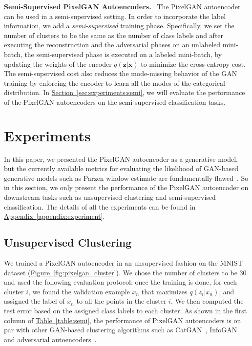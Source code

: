 \documentclass{article}
\newcommand{\mysec}[1]{\hyperref[sec:#1]{Section~\ref*{sec:#1}}}
\newcommand{\mytable}[1]{\hyperref[table:#1]{Table~\ref*{table:#1}}}
\newcommand{\myfig}[1]{\hyperref[fig:#1]{Figure~\ref*{fig:#1}}}
\newcommand{\myappendix}[1]{\hyperref[appendix:#1]{Appendix~\ref*{appendix:#1}}}
\DeclareRobustCommand{\parhead}[1]{\textbf{#1}~}
\begin{document}
\parhead{Semi-Supervised PixelGAN Autoencoders.} The PixelGAN autoencoder can be used in a semi-supervised setting. In order to incorporate the label information, we add a \emph{semi-supervised} training phase. Specifically, we set the number of clusters to be the same as the number of class labels and after executing the reconstruction and the adversarial phases on an unlabeled mini-batch, the semi-supervised phase is executed on a labeled mini-batch, by updating the weights of the encoder $q(\mathbf{z}|\mathbf{x})$ to minimize the cross-entropy cost. The semi-supervised cost also reduces the mode-missing behavior of the GAN training by enforcing the encoder to learn all the modes of the categorical distribution. In \mysec{experiments:semi}, we will evaluate the performance of the PixelGAN autoencoders on the semi-supervised classification tasks.


\section{Experiments}\label{sec:experiments}



In this paper, we presented the PixelGAN autoencoder as a generative model, but the currently available metrics for evaluating the likelihood of GAN-based generative models such as Parzen window estimate are fundamentally flawed~\citep{theis}. So in this section, we only present the performance of the PixelGAN autoencoder on downstream tasks such as unsupervised clustering and semi-supervised classification. The details of all the experiments can be found in \myappendix{experiment}.

\subsection{Unsupervised Clustering}\label{sec:experiments:unsup}
We trained a PixelGAN autoencoder in an unsupervised fashion on the MNIST dataset (\myfig{pixelgan_cluster}). We chose the number of clusters to be 30 and used the following evaluation protocol: once the training is done, for each cluster $i$, we found the validation example $x_n$ that maximizes $q(z_i|x_n)$, and assigned the label of $x_n$ to all the points in the cluster $i$. We then computed the test error based on the assigned class labels to each cluster. As shown in the first column of \mytable{semi}, the performance of PixelGAN autoencoders is on par with other GAN-based clustering algorithms such as CatGAN~\citep{catgan}, InfoGAN~\citep{infogan} and adversarial autoencoders~\citep{aae}.
\end{document}
